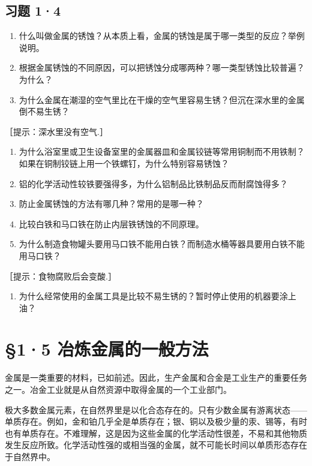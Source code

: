 \subsection{习题 1·4}

\begin{enumerate}
\item
  什么叫做金属的锈蚀？从本质上看，金属的锈蚀是属于哪一类型的反应？举例说明。
\item
  根据金属锈蚀的不同原因，可以把锈蚀分成哪两种？哪一类型锈蚀比较普遍？为什么？
\item
  为什么金属在潮湿的空气里比在干燥的空气里容易生锈？但沉在深水里的金属倒不易生锈？
\end{enumerate}

［提示：深水里没有空气.］

\begin{enumerate}[start=4]
\item
  为什么浴室里或卫生设备室里的金属器皿和金属铰链等常用铜制而不用铁制？如果在铜制铰链上用一个铁螺钉，为什么特别容易锈蚀？
\item
  铝的化学活动性较铁要强得多，为什么铝制品比铁制品反而耐腐蚀得多？
\item
  防止金属锈蚀的方法有哪几种？常用的是哪一种？
\item
  比较白铁和马口铁在防止内层铁锈蚀的不同原理。
\item
  为什么制造食物罐头要用马口铁不能用白铁？而制造水桶等器具要用白铁不能用马口铁？
\end{enumerate}

［提示：食物腐败后会变酸.］

\begin{enumerate}[start=9]
\item
  为什么经常使用的金属工具是比较不易生锈的？暂时停止使用的机器要涂上油？
\end{enumerate}

\section{§1·5 冶炼金属的一般方法}

金属是一类重要的材料，已如前述。因此，生产金属和合金是工业生产的重要任务之一。冶金工业就是从自然资源中取得金属的一个工业部门。

极大多数金属元素，在自然界里是以化合态存在的。只有少数金属有游离状态------单质存在。例如，金和铂几乎全是单质存在；银、铜以及极少量的汞、锡等，有时也有单质存在。不难理解，这是因为这些金属的化学活动性很差，不易和其他物质发生反应所致。化学活动性强的或相当强的金属，就不可能长时间以单质形态存在于自然界中。

